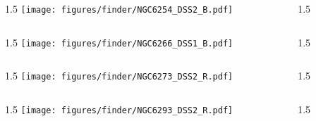 \documentclass[final]{beamer}
\newlength{\colwidth}
\begin{document}

\begin{frame}[t]{}
  \begin{columns}[T]
    \begin{column}{1.5\colwidth}
      \centering
      \texttt{[image: figures/finder/NGC6254\_DSS2\_B.pdf]}
    \end{column}
    \begin{column}{1.5\colwidth}
      \Large
      
    \end{column}
  \end{columns}
  \vspace{\fill}
  \begin{columns}[T]
    \begin{column}{1.5\colwidth}
      \centering
      \texttt{[image: figures/finder/NGC6266\_DSS1\_B.pdf]}
    \end{column}
    \begin{column}{1.5\colwidth}
      \Large
      
    \end{column}
  \end{columns}
\end{frame}


\begin{frame}[t]{}
  \begin{columns}[T]
    \begin{column}{1.5\colwidth}
      \centering
      \texttt{[image: figures/finder/NGC6273\_DSS2\_R.pdf]}
    \end{column}
    \begin{column}{1.5\colwidth}
      \Large
      
    \end{column}
  \end{columns}
  \vspace{\fill}
  \begin{columns}[T]
    \begin{column}{1.5\colwidth}
      \centering
      \texttt{[image: figures/finder/NGC6293\_DSS2\_R.pdf]}
    \end{column}
    \begin{column}{1.5\colwidth}
      \Large
      
    \end{column}
  \end{columns}
\end{frame}
\end{document}
